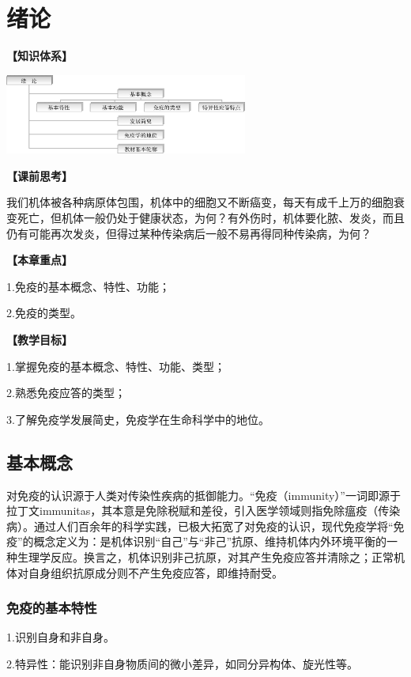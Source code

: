 \chapter{绪论}
\begin{framed}
\noindent\textbf{【知识体系】}
\begin{center}
\includegraphics[width=0.6\textwidth]{./images/Image00007.jpg}
\end{center}
\noindent\textbf{【课前思考】}

我们机体被各种病原体包围，机体中的细胞又不断癌变，每天有成千上万的细胞衰变死亡，但机体一般仍处于健康状态，为何？有外伤时，机体要化脓、发炎，而且仍有可能再次发炎，但得过某种传染病后一般不易再得同种传染病，为何？

\noindent\textbf{【本章重点】}

1.免疫的基本概念、特性、功能；

2.免疫的类型。

\noindent\textbf{【教学目标】}

1.掌握免疫的基本概念、特性、功能、类型；

2.熟悉免疫应答的类型；

3.了解免疫学发展简史，免疫学在生命科学中的地位。
\end{framed}
\section{基本概念}

对免疫的认识源于人类对传染性疾病的抵御能力。“免疫（immunity）”一词即源于拉丁文immunitas，其本意是免除税赋和差役，引入医学领域则指免除瘟疫（传染病）。通过人们百余年的科学实践，已极大拓宽了对免疫的认识，现代免疫学将“免疫”的概念定义为：是机体识别“自己”与“非己”抗原、维持机体内外环境平衡的一种生理学反应。换言之，机体识别非己抗原，对其产生免疫应答并清除之；正常机体对自身组织抗原成分则不产生免疫应答，即维持耐受。


\subsection{免疫的基本特性}

1.识别自身和非自身。

2.特异性：能识别非自身物质间的微小差异，如同分异构体、旋光性等。

